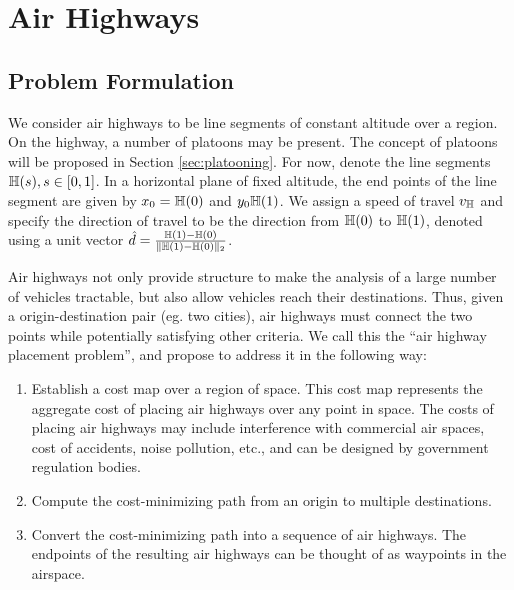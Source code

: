 \section{Air Highways}
\subsection{Problem Formulation}
We consider air highways to be line segments of constant altitude over a region. On the highway, a number of platoons may be present. The concept of platoons will be proposed in Section \ref{sec:platooning}. For now, denote the line segments $\mathbb{H}(s), s\in[0,1]$. In a horizontal plane of fixed altitude, the end points of the line segment are given by $x_0 = \mathbb{H}(0)$ and $y_0\mathbb{H}(1)$. We assign a speed of travel $v_{\mathbb{H}}$ and specify the direction of travel to be the direction from $\mathbb{H}(0)$ to $\mathbb{H}(1)$, denoted using a unit vector $\hat{d} = \frac{\mathbb{H}(1) - \mathbb{H}(0)}{\lVert\mathbb{H}(1) - \mathbb{H}(0)\rVert_2}$.

Air highways not only provide structure to make the analysis of a large number of vehicles tractable, but also allow vehicles reach their destinations. Thus, given a origin-destination pair (eg. two cities), air highways must connect the two points while potentially satisfying other criteria. We call this the ``air highway placement problem'', and propose to address it in the following way:

\begin{enumerate}
\item Establish a cost map over a region of space. This cost map represents the aggregate cost of placing air highways over any point in space. The costs of placing air highways may include interference with commercial air spaces, cost of accidents, noise pollution, etc., and can be designed by government regulation bodies.
\item Compute the cost-minimizing path from an origin to multiple destinations. 
\item Convert the cost-minimizing path into a sequence of air highways. The endpoints of the resulting air highways can be thought of as waypoints in the airspace.
\end{enumerate}